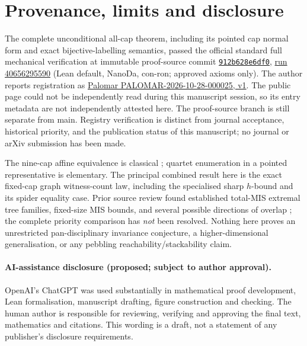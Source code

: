 \documentclass[12pt,a4paper]{article}
\begin{document}
\section{Provenance, limits and disclosure}\label{sec:formal}
The complete unconditional all-cap theorem, including its pointed cap normal form and exact bijective-labelling semantics, passed the official standard full mechanical verification at immutable proof-source commit \href{https://github.com/jfairfaxball-348/Pan-Disciplinary-Invariance-Conjecture/commit/912b628e6df0f4881f56e8f341031ec8d99d4e9e}{\texttt{912b628e6df0}}, \href{https://github.com/jfairfaxball-348/Pan-Disciplinary-Invariance-Conjecture/actions/runs/40656295590}{run 40656295590} (Lean default, NanoDa, con-ron; approved axioms only). The author reports registration as \href{https://palomar-registry.org/entry.html?id=PALOMAR-2026-10-28-000025\&version=1}{Palomar PALOMAR-2026-10-28-000025, v1}. The public page could not be independently read during this manuscript session, so its entry metadata are not independently attested here. The proof-source branch is still separate from main. Registry verification is distinct from journal acceptance, historical priority, and the publication status of this manuscript; no journal or arXiv submission has been made.

The nine-cap affine equivalence is classical \cite{Follett2014}; quartet enumeration in a pointed representative is elementary. The principal combined result here is the exact fixed-cap graph witness-count law, including the specialised sharp $h$-bound and its spider equality case. Prior source review found established total-MIS extremal tree families, fixed-size MIS bounds, and several possible directions of overlap \cite{Liu1993,Li2013,Nielsen2002,He2022}; the complete priority comparison has \emph{not} been resolved. Nothing here proves an unrestricted pan-disciplinary invariance conjecture, a higher-dimensional generalisation, or any pebbling reachability/stackability claim.

\paragraph{AI-assistance disclosure (proposed; subject to author approval).} OpenAI's ChatGPT was used substantially in mathematical proof development, Lean formalisation, manuscript drafting, figure construction and checking. The human author is responsible for reviewing, verifying and approving the final text, mathematics and citations. This wording is a draft, not a statement of any publisher's disclosure requirements.
\end{document}
